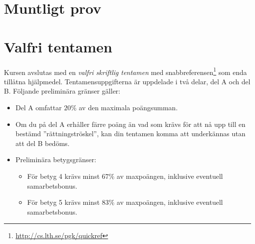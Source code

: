 \section{Muntligt prov}



\section{Valfri tentamen}

Kursen avslutas med en \emph{valfri skriftlig tentamen} med snabbreferensen\footnote{\url{http://cs.lth.se/pgk/quickref}} som enda tillåtna hjälpmedel. Tentamensuppgifterna är uppdelade i två delar, del A och del B. Följande preliminära gränser gäller:

\begin{itemize}

\item Del A omfattar $20\%$ av den maximala poängsumman.
\item  Om du på del A erhåller färre poäng än vad som krävs för att nå upp till en bestämd ''rättningströskel'', kan din tentamen komma att underkännas utan att del B bedöms.
\item Preliminära betygsgränser:
\begin{itemize}
\item  För betyg 4 krävs minst $67\%$ av maxpoängen, inklusive eventuell samarbetsbonus.
\item  För betyg 5 krävs minst $83\%$ av maxpoängen, inklusive eventuell samarbetsbonus.
\end{itemize}
\end{itemize}
